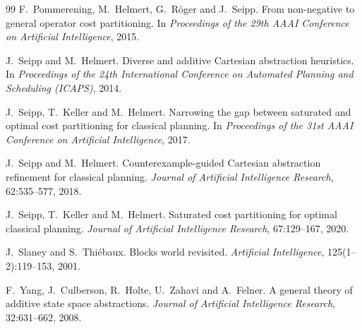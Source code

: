 \documentclass[10pt,twocolumn,a4paper]{article}
\theoremstyle{plain}
\theoremstyle{definition}
\theoremstyle{remark}
\begin{document}
\begin{thebibliography}{99}
F.~Pommerening, M.~Helmert, G.~R\"oger and J.~Seipp.
\newblock From non-negative to general operator cost partitioning.
\newblock In \emph{Proceedings of the 29th AAAI Conference on Artificial
  Intelligence}, 2015.

J.~Seipp and M.~Helmert.
\newblock Diverse and additive Cartesian abstraction heuristics.
\newblock In \emph{Proceedings of the 24th International Conference on Automated
  Planning and Scheduling (ICAPS)}, 2014.

J.~Seipp, T.~Keller and M.~Helmert.
\newblock Narrowing the gap between saturated and optimal cost partitioning for
  classical planning.
\newblock In \emph{Proceedings of the 31st AAAI Conference on Artificial
  Intelligence}, 2017.

J.~Seipp and M.~Helmert.
\newblock Counterexample-guided Cartesian abstraction refinement for classical
  planning.
\newblock \emph{Journal of Artificial Intelligence Research}, 62:535--577, 2018.

J.~Seipp, T.~Keller and M.~Helmert.
\newblock Saturated cost partitioning for optimal classical planning.
\newblock \emph{Journal of Artificial Intelligence Research}, 67:129--167, 2020.

J.~Slaney and S.~Thi\'ebaux.
\newblock Blocks world revisited.
\newblock \emph{Artificial Intelligence}, 125(1--2):119--153, 2001.

F.~Yang, J.~Culberson, R.~Holte, U.~Zahavi and A.~Felner.
\newblock A general theory of additive state space abstractions.
\newblock \emph{Journal of Artificial Intelligence Research}, 32:631--662, 2008.

\end{thebibliography}
\end{document}
